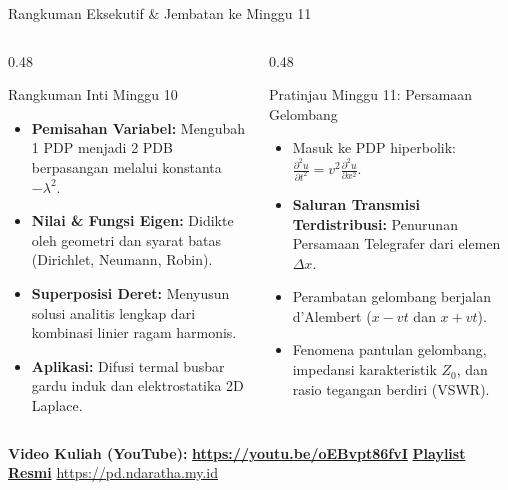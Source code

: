 \documentclass[aspectratio=169,10pt]{beamer}
\begin{document}
\begin{frame}{Rangkuman Eksekutif \& Jembatan ke Minggu 11}
  \begin{columns}[t]
    \begin{column}{0.48\textwidth}
      \begin{block}{Rangkuman Inti Minggu 10}
        \begin{itemize}
          \item \textbf{Pemisahan Variabel:} Mengubah 1 PDP menjadi 2 PDB berpasangan melalui konstanta $-\lambda^2$.
          \item \textbf{Nilai \& Fungsi Eigen:} Didikte oleh geometri dan syarat batas (Dirichlet, Neumann, Robin).
          \item \textbf{Superposisi Deret:} Menyusun solusi analitis lengkap dari kombinasi linier ragam harmonis.
          \item \textbf{Aplikasi:} Difusi termal busbar gardu induk dan elektrostatika 2D Laplace.
        \end{itemize}
      \end{block}
    \end{column}
    \begin{column}{0.48\textwidth}
      \begin{alertblock}{Pratinjau Minggu 11: Persamaan Gelombang}
        \begin{itemize}
          \item Masuk ke PDP hiperbolik: $\frac{\partial^2 u}{\partial t^2} = v^2 \frac{\partial^2 u}{\partial x^2}$.
          \item \textbf{Saluran Transmisi Terdistribusi:} Penurunan Persamaan Telegrafer dari elemen $\Delta x$.
          \item Perambatan gelombang berjalan d'Alembert ($x - vt$ dan $x + vt$).
          \item Fenomena pantulan gelombang, impedansi karakteristik $Z_0$, dan rasio tegangan berdiri (VSWR).
        \end{itemize}
      \end{alertblock}
    \end{column}
  \end{columns}
  \vspace{0.06cm}
  \begin{center}
    \scriptsize \textbf{Video Kuliah (YouTube):} {\color{red!80!black}\textbf{\url{https://youtu.be/oEBvpt86fvI}}} \quad \textbar \quad \href{https://www.youtube.com/playlist?list=PLS5oOZWXZeTw}{\color{unibblue}\textbf{Playlist Resmi}} \quad \textbar \quad \url{https://pd.ndaratha.my.id}
  \end{center}
\end{frame}
\end{document}
